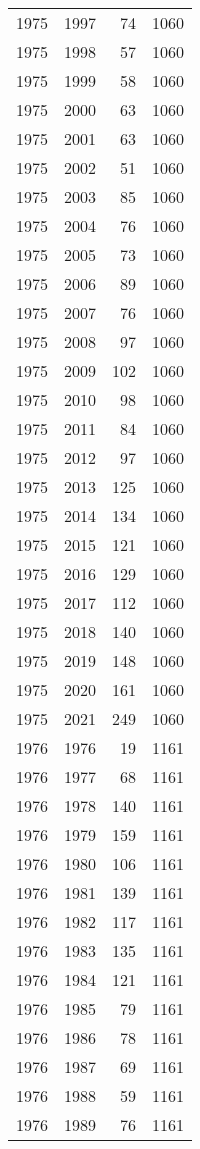\documentclass[
  10pt,
  letterpaper,
  DIV=11,
  numbers=noendperiod,
  twoside]{scrartcl}
\begin{document}
\begin{longtable}[]{@{}rrrr@{}}
1975 & 1997 & 74 & 1060 \\
1975 & 1998 & 57 & 1060 \\
1975 & 1999 & 58 & 1060 \\
1975 & 2000 & 63 & 1060 \\
1975 & 2001 & 63 & 1060 \\
1975 & 2002 & 51 & 1060 \\
1975 & 2003 & 85 & 1060 \\
1975 & 2004 & 76 & 1060 \\
1975 & 2005 & 73 & 1060 \\
1975 & 2006 & 89 & 1060 \\
1975 & 2007 & 76 & 1060 \\
1975 & 2008 & 97 & 1060 \\
1975 & 2009 & 102 & 1060 \\
1975 & 2010 & 98 & 1060 \\
1975 & 2011 & 84 & 1060 \\
1975 & 2012 & 97 & 1060 \\
1975 & 2013 & 125 & 1060 \\
1975 & 2014 & 134 & 1060 \\
1975 & 2015 & 121 & 1060 \\
1975 & 2016 & 129 & 1060 \\
1975 & 2017 & 112 & 1060 \\
1975 & 2018 & 140 & 1060 \\
1975 & 2019 & 148 & 1060 \\
1975 & 2020 & 161 & 1060 \\
1975 & 2021 & 249 & 1060 \\
1976 & 1976 & 19 & 1161 \\
1976 & 1977 & 68 & 1161 \\
1976 & 1978 & 140 & 1161 \\
1976 & 1979 & 159 & 1161 \\
1976 & 1980 & 106 & 1161 \\
1976 & 1981 & 139 & 1161 \\
1976 & 1982 & 117 & 1161 \\
1976 & 1983 & 135 & 1161 \\
1976 & 1984 & 121 & 1161 \\
1976 & 1985 & 79 & 1161 \\
1976 & 1986 & 78 & 1161 \\
1976 & 1987 & 69 & 1161 \\
1976 & 1988 & 59 & 1161 \\
1976 & 1989 & 76 & 1161 \\

\end{longtable}
\end{document}
